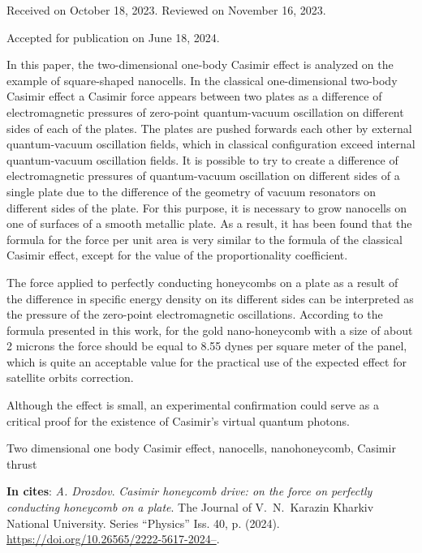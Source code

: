 \documentclass[twoside, 10pt, ptm]{article}
\def\myname{A. Drozdov}
\def\mytitle{Casimir honeycomb drive: on the force on perfectly conducting honeycomb on a plate}
\def\mydoi{10.26565/2222-5617-2024--}
\def\envisnyk{The Journal of V.~N.~Karazin Kharkiv National University. Series “Physics” Iss. 40, p. (2024)}
\def\myreceived{Received on October 18, 2023. Reviewed on November 16, 2023.}
\def\myaccepted{Accepted for publication on June 18, 2024.}
\begin{document}
\vspace{3mm}
\centerline{\myreceived}
\centerline{\myaccepted}

\vspace{3.5mm}

In this paper, the two-dimensional one-body Casimir effect is analyzed
on the example of square-shaped nanocells.
In the classical one-dimensional two-body Casimir effect a Casimir force
appears between two plates as a difference of electromagnetic pressures
of zero-point quantum-vacuum oscillation on different sides of each of the plates.
The plates are pushed forwards each other by external quantum-vacuum oscillation fields,
which in classical configuration exceed internal quantum-vacuum oscillation fields.
It is possible to try to create a difference of electromagnetic pressures
of quantum-vacuum oscillation on different sides of a single plate
due to the difference of the geometry of vacuum resonators on different sides of the plate.
For this purpose, it is necessary to grow nanocells on one of surfaces of a smooth metallic plate.
As a result, it has been found that the formula for the force per unit area is very similar to the formula of the classical Casimir effect,
except for the value of the proportionality coefficient.

The force applied to perfectly conducting honeycombs on a plate as a result of the
difference in specific energy density on its different sides can be interpreted
as the pressure of the zero-point electromagnetic oscillations.
According to the formula presented in this work, for the gold nano-honeycomb
with a size of about 2 microns the force should be equal to 8.55 dynes per square meter of the panel, which is quite
an acceptable value for the practical use of the expected effect for satellite orbits correction.

    Although the effect is small, an experimental confirmation
could serve as a critical proof for the existence of Casimir's virtual quantum photons.



\begin{keywords}
Two dimensional one body Casimir effect, nanocells, nanohoneycomb, Casimir thrust
\end{keywords}

\vspace{5mm}

\noindent
\textbf{In cites}: \textit{\myname}. \textit{\mytitle}. {\envisnyk}. \href{https://doi.org/\mydoi}{https://doi.org/\mydoi}.
\end{document}
